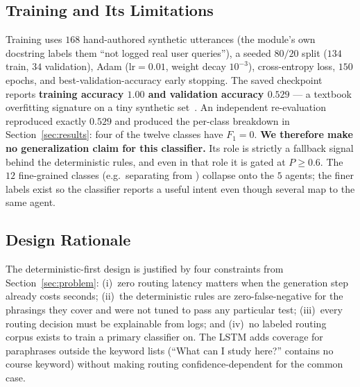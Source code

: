 \subsection{Training and Its Limitations}
Training uses $168$ hand-authored synthetic utterances (the module's own
docstring labels them ``not logged real user queries''), a seeded $80/20$
split ($134$ train, $34$ validation), Adam ($\text{lr}=0.01$, weight decay
$10^{-3}$), cross-entropy loss, $150$ epochs, and best-validation-accuracy
early stopping. The saved checkpoint reports \textbf{training accuracy
$1.00$ and validation accuracy $0.529$} --- a textbook overfitting
signature on a tiny synthetic set~\cite{goodfellow2016deep}. An independent
re-evaluation reproduced exactly $0.529$ and produced the per-class
breakdown in Section~\ref{sec:results}: four of the twelve classes have
$F_1 = 0$. \textbf{We therefore make no generalization claim for this
classifier.} Its role is strictly a fallback signal behind the
deterministic rules, and even in that role it is gated at $P \ge 0.6$.
The $12$ fine-grained classes (e.g.\ separating  from
) collapse onto the $5$ agents; the finer labels
exist so the classifier reports a useful intent even though several map to
the same agent.

\subsection{Design Rationale}
The deterministic-first design is justified by four constraints from
Section~\ref{sec:problem}: (i)~zero routing latency matters when the
generation step already costs seconds; (ii)~the deterministic rules are
zero-false-negative for the phrasings they cover and were not tuned to pass
any particular test; (iii)~every routing decision must be explainable from
logs; and (iv)~no labeled routing corpus exists to train a primary
classifier on. The LSTM adds coverage for paraphrases outside the keyword
lists (``What can I study here?'' contains no course keyword) without
making routing confidence-dependent for the common case.
